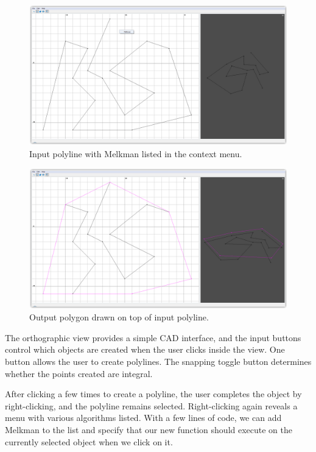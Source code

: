 \begin{figure}[htb]
	\centering
	\includegraphics[width=\textwidth]{figures/melkman-input-1}
	\caption{Input polyline with Melkman listed in the context menu.} 
	\label{fig:melkman-input}
\end{figure}

\begin{figure}[htb]
	\centering
	\includegraphics[width=\textwidth]{figures/melkman-output-1}
	\caption{Output polygon drawn on top of input polyline.} 
	\label{fig:melkman-output}
\end{figure}  

The orthographic view provides a simple CAD interface, and the input buttons
control which objects are created when the user clicks inside the view. One
button allows the user to create polylines. The snapping toggle button
determines whether the points created are integral. 

After clicking a few times to create a polyline, the user completes the object
by right-clicking, and the polyline remains selected. Right-clicking again
reveals a menu with various algorithms listed. With a few lines of code, we can 
add Melkman to the list and specify that our new function should execute on
the currently selected object when we click on it. 


